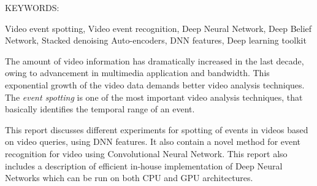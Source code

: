 \abstract

\noindent KEYWORDS: \hspace*{0.5em} \parbox[t]{4.4in}{Video event spotting, Video event recognition, Deep Neural Network, Deep Belief Network, Stacked denoising Auto-encoders, DNN features, Deep learning toolkit }

\vspace*{24pt}

The amount of video information has dramatically increased in the last decade, owing to advancement in multimedia application and bandwidth.  This exponential growth of the video data demands better video analysis techniques.  The \textit{event spotting} is one of the most important video analysis techniques, that basically identifies the temporal range of an event.

This report discusses different experiments for spotting of events in videos based on video queries, using DNN features.  It also contain a novel method for event recognition for video using Convolutional Neural Network.  This report also includes a description of efficient in-house implementation of Deep Neural Networks which can be run on both CPU and GPU architectures.
\pagebreak